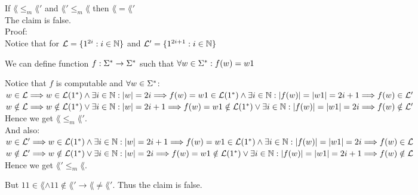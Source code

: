 If $\lang \leq_m \lang'$ and $\lang' \leq_m \lang$ then $\lang = \lang'$ \\
The claim is false. \\

Proof: \\
Notice that for $\mathcal{L} = \{1^{2i} : i \in \mathbb{N}\}$ and
$\mathcal{L}' = \{1^{2i+1} : i \in \mathbb{N}\}$

We can define function $f: \Sigma^* \rightarrow \Sigma^*$ such that $\forall w \in \Sigma^*: f(w) = w1$

Notice that $f$ is computable and $\forall w \in \Sigma^*$: \\
$w \in \mathcal{L} \\
    \Longrightarrow w \in \mathcal{L}(1^*) \wedge \exists i \in \mathbb{N}: |w| = 2i \\
    \Longrightarrow f(w) = w1 \in \mathcal{L}(1^*) \wedge \exists i \in \mathbb{N}: |f(w)| = |w1| = 2i+1  \\
    \Longrightarrow f(w) \in \mathcal{L}'$ \\

$w \notin \mathcal{L} \\
    \Longrightarrow w \notin \mathcal{L}(1^*) \vee \exists i \in \mathbb{N}: |w| = 2i+1 \\
    \Longrightarrow f(w) = w1 \notin \mathcal{L}(1^*) \vee \exists i \in \mathbb{N}: |f(w)| = |w1| = 2i \\
    \Longrightarrow f(w) \notin \mathcal{L}'$ \\

Hence we get $\lang \leq_m \lang'$. \\

And also: \\
$w \in \mathcal{L}' \\
    \Longrightarrow w \in \mathcal{L}(1^*) \wedge \exists i \in \mathbb{N}: |w| = 2i+1 \\
    \Longrightarrow f(w) = w1 \in \mathcal{L}(1^*) \wedge \exists i \in \mathbb{N}: |f(w)| = |w1| = 2i \\
    \Longrightarrow f(w) \in \mathcal{L}$ \\

$w \notin \mathcal{L}' \\
    \Longrightarrow w \notin \mathcal{L}(1^*) \vee \exists i \in \mathbb{N}: |w| = 2i \\
    \Longrightarrow f(w) = w1 \notin \mathcal{L}(1^*) \vee \exists i \in \mathbb{N}: |f(w)| = |w1| = 2i+1 \\
    \Longrightarrow f(w) \notin \mathcal{L}$ \\

Hence we get $\lang' \leq_m \lang$.

But $11 \in \lang \wedge 11 \notin \lang' \rightarrow \lang \neq \lang'$. Thus the claim is false. \\
